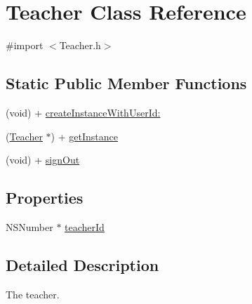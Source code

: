 \hypertarget{interface_teacher}{\section{\-Teacher \-Class \-Reference}
\label{interface_teacher}
}


{\ttfamily \#import $<$\-Teacher.\-h$>$}

\subsection*{\-Static \-Public \-Member \-Functions}
\begin{DoxyCompactItemize}
\item 
(void) + \hyperlink{interface_teacher_a2d5ee0104259dcccf6b4ed3afcc136e5}{create\-Instance\-With\-User\-Id\-:}
\item 
(\hyperlink{interface_teacher}{\-Teacher} $\ast$) + \hyperlink{interface_teacher_a36613be34bb261fd9b7f255bfacccd1b}{get\-Instance}
\item 
(void) + \hyperlink{interface_teacher_abb9d906f1b1b38d4e39e874fa851a6bb}{sign\-Out}
\end{DoxyCompactItemize}
\subsection*{\-Properties}
\begin{DoxyCompactItemize}
\item 
\-N\-S\-Number $\ast$ \hyperlink{interface_teacher_a7662ecb73144ebf2698113911d164dc6}{teacher\-Id}
\end{DoxyCompactItemize}


\subsection{\-Detailed \-Description}
\-The teacher. 

